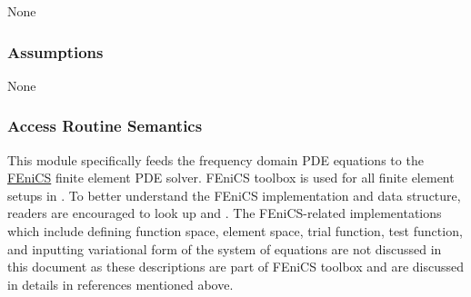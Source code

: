\documentclass[12pt, titlepage]{article}
\begin{document}
	None
	
	\subsubsection{Assumptions}
	
	None
	
	\subsubsection{Access Routine Semantics}
	
	This module specifically feeds the frequency domain PDE equations to the
	\hyperref{https://fenicsproject.org/}{}{}{FEniCS} finite element PDE solver.
	FEniCS toolbox is used for all finite element setups in \progname{}. To better
	understand the  FEniCS implementation and data structure, readers are encouraged
	to look up \cite{alnaes2015fenics} and \cite{logg2012finite}. The FEniCS-related
	implementations which include defining function space, element space, trial
	function, test function, and inputting variational form of the system of
	equations are not discussed in this document as these descriptions are part of
	FEniCS toolbox and are discussed in details in references mentioned above.
	
\end{document}
